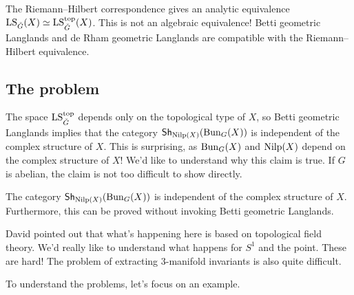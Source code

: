 \documentclass{article}
\begin{document}
\begin{rmk}
  The Riemann--Hilbert correspondence gives an analytic equivalence $\operatorname{LS}_{\check{G}}(X) \simeq \operatorname{LS}_{\check{G}}^{\mathrm{top}}(X)$.
  This is not an algebraic equivalence!
  Betti geometric Langlands and de Rham geometric Langlands are compatible with the Riemann--Hilbert equivalence.
\end{rmk}

\subsection{The problem}

The space $\operatorname{LS}_{\check{G}}^{\mathrm{top}}$ depends only on the topological type of $X$, so Betti geometric Langlands implies that the category $\mathsf{Sh}_{\operatorname{Nilp}(X)}(\operatorname{Bun}_G(X))$ is independent of the complex structure of $X$.
This is surprising, as $\operatorname{Bun}_G(X)$ and $\operatorname{Nilp}(X)$ depend on the complex structure of $X$!
We'd like to understand why this claim is true.
If $G$ is abelian, the claim is not too difficult to show directly.

\begin{thm}[F--Kj{\ae}rsgaard]
  The category $\mathsf{Sh}_{\operatorname{Nilp}(X)}(\operatorname{Bun}_G(X))$ is independent of the complex structure of $X$.
  Furthermore, this can be proved without invoking Betti geometric Langlands.
\end{thm}

\begin{rmk}
  David pointed out that what's happening here is based on topological field theory.
  We'd really like to understand what happens for $S^1$ and the point.
  These are hard!
  The problem of extracting 3-manifold invariants is also quite difficult.
\end{rmk}

To understand the problems, let's focus on an example.
\end{document}
